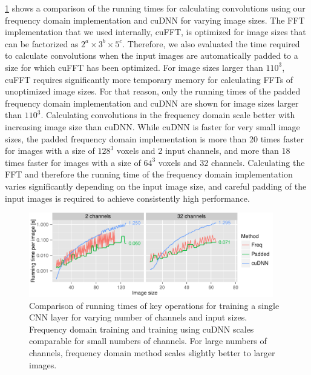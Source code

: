 \ref{fig:imagesize} shows a comparison of the running times for calculating
convolutions using our frequency domain implementation and cuDNN for varying
image sizes. The FFT implementation that we used internally, cuFFT, is optimized
for image sizes that can be factorized as $2^a\times3^b\times5^c$. Therefore, we
also evaluated the time required to calculate convolutions when the input images
are automatically padded to a size for which cuFFT has been optimized. For image
sizes larger than $110^3$, cuFFT requires significantly more temporary memory
for calculating FFTs of unoptimized image sizes. For that reason, only the
running times of the padded frequency domain implementation and cuDNN are shown
for image sizes larger than $110^3$. Calculating convolutions in the frequency
domain scale better with increasing image size than cuDNN. While
cuDNN is faster for very small image sizes, the padded frequency domain
implementation is more than 20 times faster for images with a size of $128^3$
voxels and 2 input channels, and more than 18 times faster for images with a
size of $64^3$ voxels and 32 channels. Calculating the FFT and therefore the
running time of the frequency domain implementation varies significantly
depending on the input image size, and careful padding of the input images is
required to achieve consistently high performance.


\begin{figure}
\centering
\includegraphics[width=0.95\textwidth]{figures/imagesize2}
\caption[Comparison of running times of key operations for training a single
CNN layer.]{Comparison of running times of key operations for training a single
CNN layer for varying number of channels and input sizes. Frequency domain
training and training using cuDNN scales comparable for small numbers of
channels. For large numbers of channels, frequency domain method scales
slightly better to larger images.}
\label{fig:imagesize}
\end{figure}

